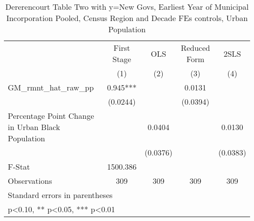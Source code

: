 \begin{table}[htbp]\centering
\def\sym#1{\ifmmode^{#1}\else\(^{#1}\)\fi}
\caption{Dererencourt Table Two with y=New Govs, Earliest Year of Municipal Incorporation  Pooled, Census Region and Decade FEs controls, Urban Population}
\begin{tabular}{l*{4}{c}}
\toprule
                    & First Stage   &         OLS   &Reduced Form   &        2SLS   \\
                    &\multicolumn{1}{c}{(1)}   &\multicolumn{1}{c}{(2)}   &\multicolumn{1}{c}{(3)}   &\multicolumn{1}{c}{(4)}   \\
\midrule
GM\_rmnt\_hat\_raw\_pp  &       0.945***&               &      0.0131   &               \\
                    &    (0.0244)   &               &    (0.0394)   &               \\
\addlinespace
Percentage Point Change in Urban Black Population&               &      0.0404   &               &      0.0130   \\
                    &               &    (0.0376)   &               &    (0.0383)   \\
\midrule
F-Stat              &    1500.386   &               &               &               \\
Observations        &         309   &         309   &         309   &         309   \\
\bottomrule
\multicolumn{5}{l}{\footnotesize Standard errors in parentheses}\\
\multicolumn{5}{l}{\footnotesize * p<0.10, ** p<0.05, *** p<0.01}\\
\end{tabular}
\end{table}
